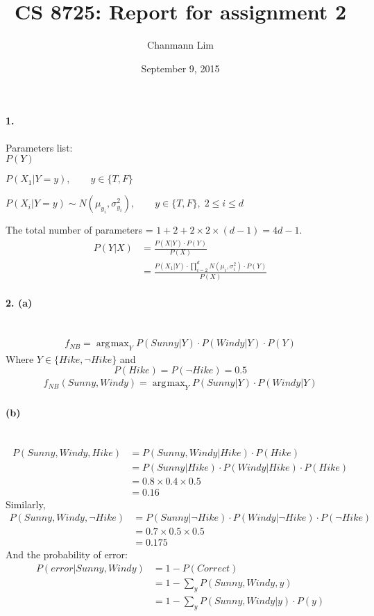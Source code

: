 \documentclass[a4paper]{article}
\DeclareMathOperator*{\argmax}{\arg\!\max}
\begin{document}
\title{CS 8725: Report for assignment 2}
\author{Chanmann Lim}
\date{September 9, 2015}
\maketitle

\paragraph{1.} Parameters list: \\

	$ P(Y) $
	
	$ P(X_1|Y = y), \qquad y \in \{T, F\} $
	
	$ P(X_i|Y = y) \sim N(\mu_{y_i}, \sigma_{y_i}^2), \qquad y \in \{T, F\}, \; 2 \leq i \leq d $
	
	The total number of parameters = $1 + 2 + 2 \times 2 \times (d-1) = 4d - 1 $.
	\begin{align}
		P(Y|X) &= \frac{P(X|Y) \cdot P(Y)}{P(X)} \\
			&= \frac{P(X_1|Y) \cdot \prod_{i=2}^d N(\mu_i, \sigma_i^2) \cdot P(Y)}{P(X)}
	\end{align} 

\paragraph{2. (a)} ~\\
	\begin{align}
		f_{NB} = \argmax_{Y} P(Sunny|Y) \cdot P(Windy|Y) \cdot P(Y)
	\end{align}
	Where $Y \in \{Hike, \neg Hike\}$ and 
	$$ P(Hike) = P(\neg Hike) = 0.5 $$
	\begin{align}
		f_{NB}(Sunny, Windy) = \argmax_{Y} P(Sunny|Y) \cdot P(Windy|Y)
	\end{align}
	
\paragraph{(b)} ~\\
	\begin{align}
		P(Sunny, Windy, Hike) &= P(Sunny, Windy | Hike) \cdot P(Hike)\\
			&= P(Sunny | Hike) \cdot P(Windy | Hike) \cdot P(Hike)\\
			&= 0.8 \times 0.4 \times 0.5\\
			&= 0.16
	\end{align}
	Similarly,
	\begin{align}
		P(Sunny, Windy, \neg Hike) &= P(Sunny | \neg Hike) \cdot P(Windy | \neg Hike) \cdot P(\neg Hike)\\
			&= 0.7 \times 0.5 \times 0.5\\
			&= 0.175
	\end{align}
	And the probability of error:
	\begin{align}
		P(error|Sunny, Windy) &= 1 - P(Correct) \\
			&= 1 - \sum_{y} P(Sunny, Windy, y) \\
			&= 1 - \sum_{y} P(Sunny, Windy | y) \cdot P(y)
	\end{align}
\end{document}
